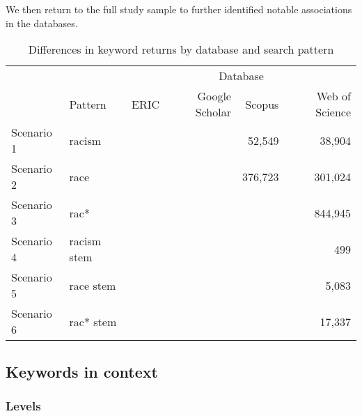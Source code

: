 
We then return to the full study sample to further identified notable associations in the databases.

\renewcommand{\arraystretch}{1.25}
\begin{table}[h]
\caption{Differences in keyword returns by database and search pattern}
\centering
\begin{tabular}{llrrrr}
\toprule
           &             & \multicolumn{4}{c}{Database}                    \\
           \cmidrule{3-6}
           & {Pattern}     & {ERIC} & {Google Scholar} & {Scopus} & {Web of Science} \\
           \midrule
Scenario 1 & racism      &      &                &  52,549      &  38,904              \\
Scenario 2 & race        &      &                &    376,723    &    301,024            \\
Scenario 3 & rac*        &      &                &        &    844,945            \\
Scenario 4 & racism stem &      &                &        &   499             \\
Scenario 5 & race stem   &      &                &        &    5,083            \\
Scenario 6 & rac* stem   &      &                &        &  17,337 \\  
\bottomrule       
\end{tabular}
\label{tab:my-table}
\end{table}

\subsection{Keywords in context}

\subsubsection{Levels}

